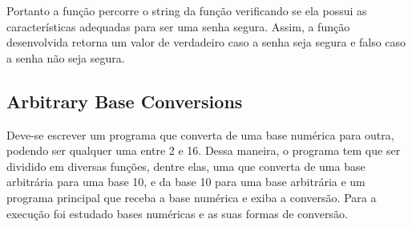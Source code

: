 Portanto a função percorre o string da função verificando se ela possui as características adequadas para ser uma senha segura. Assim, a função desenvolvida retorna um valor de verdadeiro caso a senha seja segura e falso caso a senha não seja segura.



\subsection{Arbitrary Base Conversions}

Deve-se escrever um programa que converta de uma base numérica para outra, podendo ser qualquer uma entre 2 e 16. Dessa maneira, o programa tem que ser dividido em diversas funções, dentre elas, uma que converta de uma base arbitrária para uma base 10, e da base 10 para uma base arbitrária e um programa principal que receba a base numérica e exiba a conversão. Para a execução foi estudado bases numéricas e as suas formas de conversão.

